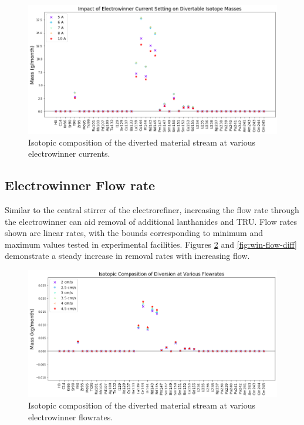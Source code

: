 \begin{figure}
	\includegraphics[width=\linewidth]{images/current-sa-diff}
	\caption{Isotopic composition of the diverted material stream at various electrowinner currents.}
	\label{fig:win-cur-diff}
\end{figure}

\subsection{Electrowinner Flow rate}

Similar to the central stirrer of the electrorefiner, increasing the flow rate through the electrowinner can aid removal of additional lanthanides and TRU. Flow rates shown are linear rates, with the bounds corresponding to minimum and maximum values tested in experimental facilities. Figures \ref{fig:win-flow-sa} and \ref{fig:win-flow-diff} demonstrate a steady increase in removal rates with increasing flow.

\begin{figure}
	\includegraphics[width=\linewidth]{images/flowrate-sa-comp}
	\caption{Isotopic composition of the diverted material stream at various electrowinner flowrates.}
	\label{fig:win-flow-sa}
\end{figure}

